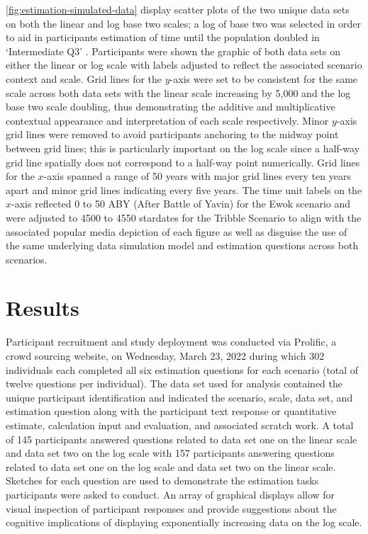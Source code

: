 \documentclass[print]{nuthesis}
\begin{document}
\cref{fig:estimation-simulated-data} display scatter plots of the two unique data sets on both the linear and log base two scales; a log of base two was selected in order to aid in participants estimation of time until the population doubled in `Intermediate Q3' .
Participants were shown the graphic of both data sets on either the linear or log scale with labels adjusted to reflect the associated scenario context and scale.
Grid lines for the \(y\)-axis were set to be consistent for the same scale across both data sets with the linear scale increasing by 5,000 and the log base two scale doubling, thus demonstrating the additive and multiplicative contextual appearance and interpretation of each scale respectively.
Minor \(y\)-axis grid lines were removed to avoid participants anchoring to the midway point between grid lines; this is particularly important on the log scale since a half-way grid line spatially does not correspond to a half-way point numerically.
Grid lines for the \(x\)-axis spanned a range of 50 years with major grid lines every ten years apart and minor grid lines indicating every five years.
The time unit labels on the \(x\)-axis reflected 0 to 50 ABY (After Battle of Yavin) for the Ewok scenario and were adjusted to 4500 to 4550 stardates for the Tribble Scenario to align with the associated popular media depiction of each figure as well as disguise the use of the same underlying data simulation model and estimation questions across both scenarios.

\hypertarget{results-3}{%
\section{Results}\label{results-3}}

Participant recruitment and study deployment was conducted via Prolific, a crowd sourcing website, on Wednesday, March 23, 2022 during which 302 individuals each completed all six estimation questions for each scenario (total of twelve questions per individual).
The data set used for analysis contained the unique participant identification and indicated the scenario, scale, data set, and estimation question along with the participant text response or quantitative estimate, calculation input and evaluation, and associated scratch work.
A total of 145 participants answered questions related to data set one on the linear scale and data set two on the log scale with 157 participants answering questions related to data set one on the log scale and data set two on the linear scale.
Sketches for each question are used to demonstrate the estimation tasks participants were asked to conduct.
An array of graphical displays allow for visual inspection of participant responses and provide suggestions about the cognitive implications of displaying exponentially increasing data on the log scale.
\end{document}
